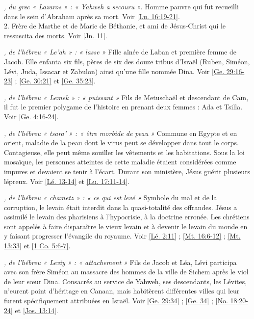 \begin{multicols}{2}
\textit{, du grec « Lazaros » : « Yahweh a secouru »}. Homme pauvre qui fut recueilli dans le sein d'Abraham après sa mort. Voir \vref{Lu. 16:19-21}.
\\2. Frère de Marthe et de Marie de Béthanie, et ami de Jésus-Christ qui le ressuscita des morts. Voir \vref{Jn. 11}.

\textit{, de l'hébreu « Le'ah » : « lasse »}\newline
Fille aînée de Laban et première femme de Jacob. Elle enfanta six fils, pères de six des douze tribus d'Israël (Ruben, Siméon, Lévi, Juda, Issacar et Zabulon) ainsi qu'une fille nommée Dina. Voir \vref{Ge. 29:16-23} ; \vref{Ge. 30:21} et \vref{Ge. 35:23}.

\textit{, de l'hébreu « Lemek » : « puissant »}\newline
Fils de Metuschaël et descendant de Caïn, il fut le premier polygame de l'histoire en prenant deux femmes : Ada et Tsilla. Voir \vref{Ge. 4:16-24}.

\textit{, de l'hébreu « tsara' » : « être morbide de peau »}\newline
Commune en Egypte et en orient, maladie de la peau dont le virus peut se développer dans tout le corps. Contagieuse, elle peut même souiller les vêtements et les habitations. Sous la loi mosaïque, les personnes atteintes de cette maladie étaient considérées comme impures et devaient se tenir à l'écart. Durant son ministère, Jésus guérit plusieurs lépreux. Voir \vref{Lé. 13-14} et \vref{Lu. 17:11-14}.

\textit{, de l'hébreu « chametz » : « ce qui est levé »}\newline
Symbole du mal et de la corruption, le levain était interdit dans la quasi-totalité des offrandes. Jésus a assimilé le levain des pharisiens à l'hypocrisie, à la doctrine erronée. Les chrétiens sont appelés à faire disparaître le vieux levain et à devenir le levain du monde en y faisant progresser l'évangile du royaume. Voir \vref{Lé. 2:11} ; \vref{Mt. 16:6-12} ; \vref{Mt. 13:33} et \vref{1 Co. 5:6-7}.

\textit{, de l'hébreu « Leviy » : « attachement »}\newline
Fils de Jacob et Léa, Lévi participa avec son frère Siméon au massacre des hommes de la ville de Sichem après le viol de leur sœur Dina. Consacrés au service de Yahweh, ses descendants, les Lévites, n'eurent point d'héritage en Canaan, mais habitèrent différentes villes qui leur furent spécifiquement attribuées en Israël. Voir \vref{Ge. 29:34} ; \vref{Ge. 34} ; \vref{No. 18:20-24} et \vref{Jos. 13:14}.


\end{multicols}

